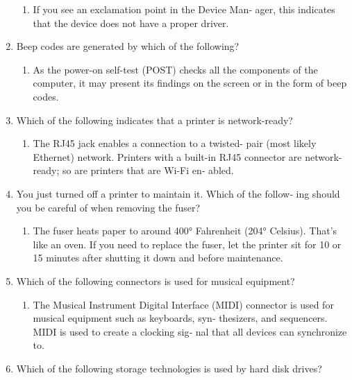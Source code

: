 \documentclass{article}
\begin{document}
\begin{enumerate}
    \begin{enumerate}
        \item If	you	see	an	exclamation	point	in	the	Device	Man‐
ager,	this	indicates	that	the	device	does	not	have	a	proper	driver.

    \end{enumerate}
    \item Beep	codes	are	generated	by	which	of	the	following?

    \begin{enumerate}
        \item As	the	power-on	self-test	(POST)	checks	all	the
components	of	the	computer,	it	may	present	its	findings	on	the
screen	or	in	the	form	of	beep	codes.

    \end{enumerate}
    \item Which	of	the	following	indicates	that	a	printer	is	network-ready?

    \begin{enumerate}
        \item The	RJ45	jack	enables	a	connection	to	a	twisted-
pair	(most	likely	Ethernet)	network.	Printers	with	a	built-in	RJ45
connector	are	network-ready;	so	are	printers	that	are	Wi-Fi	en‐
abled.

    \end{enumerate}
    \item You	just	turned	off	a	printer	to	maintain	it.	Which	of	the	follow‐
ing	should	you	be	careful	of	when	removing	the	fuser?

    \begin{enumerate}
        \item 	The	fuser	heats	paper	to	around	400°	Fahrenheit
(204°	Celsius).	That’s	like	an	oven.	If	you	need	to	replace	the
fuser,	let	the	printer	sit	for	10	or	15	minutes	after	shutting	it	down
and	before	maintenance.

    \end{enumerate}
    \item Which	of	the	following	connectors	is	used	for	musical	equipment?

    \begin{enumerate}
        \item The	Musical	Instrument	Digital	Interface	(MIDI)
connector	is	used	for	musical	equipment	such	as	keyboards,	syn‐
thesizers,	and	sequencers.	MIDI	is	used	to	create	a	clocking	sig‐
nal	that	all	devices	can	synchronize	to.
        
    \end{enumerate}
    \item Which	of	the	following	storage	technologies	is	used	by	hard
disk	drives?


\end{enumerate}
\end{document}
